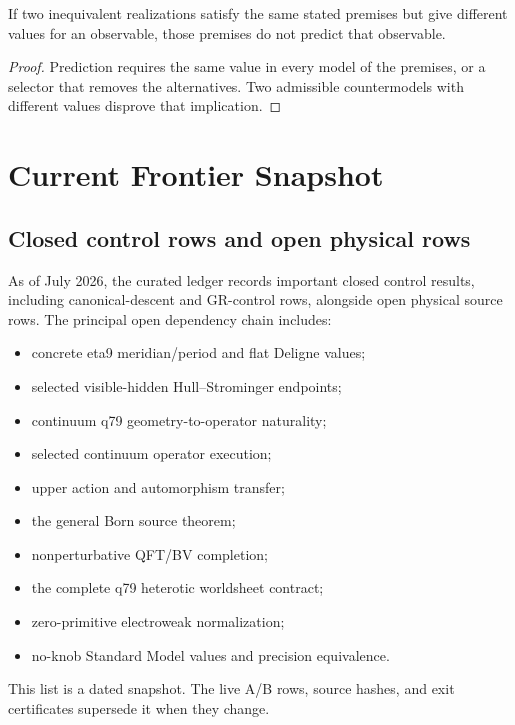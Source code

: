 \documentclass[11pt]{article}
\begin{document}
\begin{proposition}
If two inequivalent realizations satisfy the same stated premises but give
different values for an observable, those premises do not predict that
observable.
\end{proposition}

\begin{proof}
Prediction requires the same value in every model of the premises, or a
selector that removes the alternatives.  Two admissible countermodels with
different values disprove that implication.
\end{proof}

\section{Current Frontier Snapshot}

\subsection{Closed control rows and open physical rows}

As of July 2026, the curated ledger records important closed control results,
including canonical-descent and GR-control rows, alongside open physical
source rows.  The principal open dependency chain includes:
\begin{itemize}
\item concrete eta9 meridian/period and flat Deligne values;
\item selected visible-hidden Hull--Strominger endpoints;
\item continuum q79 geometry-to-operator naturality;
\item selected continuum operator execution;
\item upper action and automorphism transfer;
\item the general Born source theorem;
\item nonperturbative QFT/BV completion;
\item the complete q79 heterotic worldsheet contract;
\item zero-primitive electroweak normalization;
\item no-knob Standard Model values and precision equivalence.
\end{itemize}

This list is a dated snapshot.  The live A/B rows, source hashes, and exit
certificates supersede it when they change.
\end{document}
